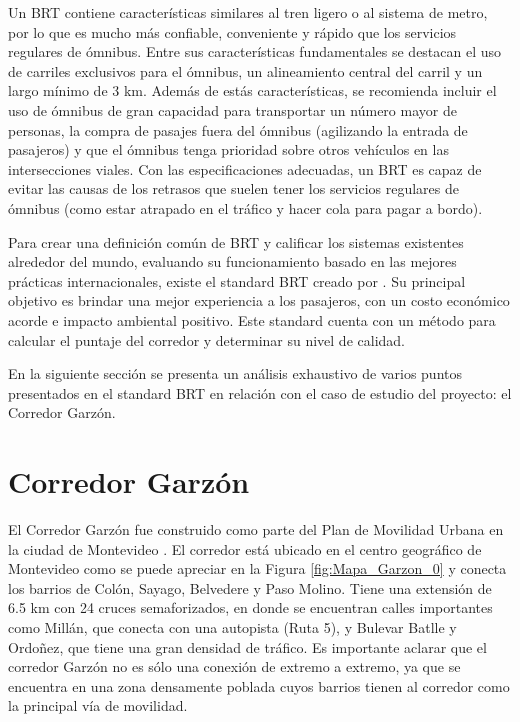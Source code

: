 Un BRT contiene características similares al tren ligero o al sistema de metro, por lo que es mucho más confiable, conveniente y rápido que los servicios regulares de ómnibus. Entre sus características fundamentales se destacan el uso de carriles exclusivos para el ómnibus, un alineamiento central del carril y un largo mínimo de 3 km. Además de estás características, se recomienda incluir el uso de ómnibus de gran capacidad para transportar un número mayor de personas, la compra de pasajes fuera del ómnibus (agilizando la entrada de pasajeros) y que el ómnibus tenga prioridad sobre otros vehículos en las intersecciones viales. Con las especificaciones adecuadas, un BRT es capaz de evitar las causas de los retrasos que suelen tener los servicios regulares de ómnibus (como estar atrapado en el tráfico y hacer cola para pagar a bordo). 

Para crear una definición común de BRT y calificar los sistemas existentes alrededor del mundo,  evaluando su funcionamiento basado en las mejores prácticas internacionales, existe el standard BRT creado por \citet{brt_standar}. Su principal objetivo es brindar una mejor experiencia a los pasajeros, con un costo económico acorde e impacto ambiental positivo. Este standard cuenta con un método para calcular el puntaje del corredor y determinar su nivel de calidad. 

En la siguiente sección se presenta un análisis exhaustivo de varios puntos presentados en el standard BRT en relación con el caso de estudio del proyecto: el Corredor Garzón.

	
\section{Corredor Garzón}	


El Corredor Garzón fue construido como parte del Plan de Movilidad Urbana en la ciudad de Montevideo \citep{PlanMovilidad}. El corredor está ubicado en el centro geográfico de Montevideo como se puede apreciar en la Figura \ref{fig:Mapa_Garzon_0} y conecta los barrios de Colón, Sayago, Belvedere y Paso Molino. Tiene una extensión de 6.5 km con 24 cruces semaforizados, en donde se encuentran calles importantes como Millán, que conecta con una autopista (Ruta 5), y Bulevar Batlle y Ordoñez, que tiene una gran densidad de tráfico. Es importante aclarar que el corredor Garzón no es sólo una conexión de extremo a extremo, ya que se encuentra en una zona densamente poblada cuyos barrios tienen al corredor como la principal vía de movilidad.

